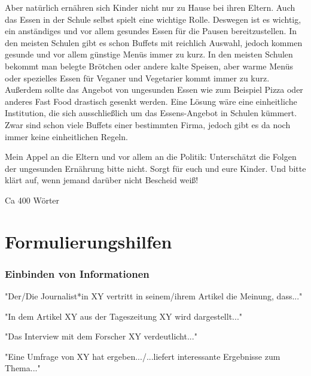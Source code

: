 Aber natürlich ernähren sich Kinder nicht nur zu Hause bei ihren Eltern. Auch das Essen in der Schule selbst spielt eine wichtige Rolle. Deswegen ist es wichtig, ein anständiges und vor allem gesundes Essen für die Pausen bereitzustellen. In den meisten Schulen gibt es schon Buffets mit reichlich Auswahl, jedoch kommen gesunde und vor allem günstige Menüs immer zu kurz. In den meisten Schulen bekommt man belegte Brötchen oder andere kalte Speisen, aber warme Menüs oder spezielles Essen für Veganer und Vegetarier kommt immer zu kurz. Außerdem sollte das Angebot von ungesunden Essen wie zum Beispiel Pizza oder anderes Fast Food drastisch gesenkt werden. Eine Lösung wäre eine einheitliche Institution, die sich ausschließlich um das Essens-Angebot in Schulen kümmert. Zwar sind schon viele Buffets einer bestimmten Firma, jedoch gibt es da noch immer keine einheitlichen Regeln. 

Mein Appel an die Eltern und vor allem an die Politik: Unterschätzt die Folgen der ungesunden Ernährung bitte nicht. Sorgt für euch und eure Kinder. Und bitte klärt auf, wenn jemand darüber nicht Bescheid weiß! 

Ca 400 Wörter 

\newpage

\section{Formulierungshilfen}
\subsubsection{Einbinden von Informationen }
\begin{compactitem}
    \item "Der/Die Journalist*in XY vertritt in seinem/ihrem Artikel die Meinung, dass..." 
    \item "In dem Artikel XY aus der Tageszeitung XY wird dargestellt..." 
    \item "Das Interview mit dem Forscher XY verdeutlicht..." 
    \item "Eine Umfrage von XY hat ergeben.../...liefert interessante Ergebnisse zum Thema..." 
\end{compactitem}

